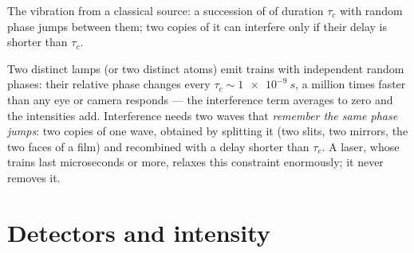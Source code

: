 \begin{omfigure}

{\small The vibration from a classical source: a succession of  of duration $\tau_c$ with random phase jumps between them; two
copies of it can interfere only if their delay is shorter than $\tau_c$.}
\end{omfigure}

\begin{remark}\label{rem:b2:scalar-light-model:twosources}
Two distinct lamps (or two distinct atoms) emit trains with
independent random phases: their relative phase changes every $\tau_c
\sim \qty{1e-9}{s}$, a million times faster than any eye or camera
responds --- the interference term averages to zero and the
intensities add. Interference needs two waves that \emph{remember the
same phase jumps}: two copies of one wave, obtained by splitting it
(two slits, two mirrors, the two faces of a film) and recombined with a
delay shorter than $\tau_c$. A laser, whose trains last microseconds or
more, relaxes this constraint enormously; it never removes it.
\end{remark}

\section{Detectors and intensity}

